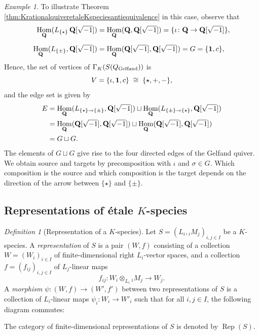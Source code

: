 \documentclass[a4paper,12pt,reqno]{amsart}
\newcommand{\QQ}{{\rm\bf Q}}
\DeclareMathOperator{\Hom}{\mathrm{Hom}}
\DeclareMathOperator{\Rep}{\mathrm{Rep}}
\theoremstyle{plain}
\theoremstyle{remark}
\newtheorem{definition}[theorem]{Definition}
\newtheorem{example}[theorem]{Example}
\begin{document}
\begin{example}
  To illustrate Theorem \ref{thm:KrationalquiveretaleKspeciesantiequivalence} in this case, observe that
  \begin{align*}
  \Hom_\QQ(L_{\{\star\}}\,\QQ[\sqrt{-1}])&=
  \Hom_\QQ(\QQ,\QQ[\sqrt{-1}])=\{\iota\colon\QQ\to\QQ[\sqrt{-1}]\},\\[0.5em]
  \Hom_\QQ(L_{\{\pm\}},\QQ[\sqrt{-1}])&=
  \Hom_\QQ(\QQ[\sqrt{-1}],\QQ[\sqrt{-1}])=G=\{{\bf1},c\},
  \end{align*}
  Hence, the set of vertices of $\Gamma_K(S(Q_{\rm Gelfand}))$ is
  \[
  V=\{\iota,{\bf1},c\}\;\cong\;\{\star,+,-\},
  \]
  and the edge set is given by
  \begin{align*}
  E&=
  \Hom_{\QQ}(L_{\{\star\}\to\{\pm\}},\QQ[\sqrt{-1}])\sqcup
  \Hom_{\QQ}(L_{\{\pm\}\to\{\star\}},\QQ[\sqrt{-1}])\\
  &=
  \Hom_{\QQ}(\QQ[\sqrt{-1}],\QQ[\sqrt{-1}])\sqcup
  \Hom_{\QQ}(\QQ[\sqrt{-1}],\QQ[\sqrt{-1}])\\
  &=G\sqcup G.
  \end{align*}
  The elements of $G\sqcup G$ give rise to the four directed edges of the Gelfand quiver. We obtain source and targets by precomposition with $\iota$ and $\sigma\in G$. Which composition is the source and which composition is the target depends on the direction of the arrow between $\{\star\}$ and $\{\pm\}$.
  \end{example}

  \subsection{Representations of \'etale $K$-species}

  \begin{definition}[Representation of a $K$-species]
  Let $S=(L_i, {}_iM_j)_{i,j\in I}$ be a $K$-species. A \emph{representation} of $S$ is a pair $(W, f)$ consisting of a collection $W = (W_i)_{i \in I}$ of finite-dimensional right $L_i$-vector spaces, and a collection $f = (f_{ij})_{i,j \in I}$ of $L_j$-linear maps
  \[
    f_{ij} \colon W_i \otimes_{L_i} {}_iM_j \to W_j.
  \]
  A \emph{morphism} $\psi \colon (W, f) \to (W', f')$ between two representations of $S$ is a collection of $L_i$-linear maps $\psi_i \colon W_i \to W'_i$ such that for all $i,j \in I$, the following diagram commutes:
  \begin{center}
  \end{center}
  The category of finite-dimensional representations of $S$ is denoted by $\Rep(S)$.
  \end{definition}
\end{document}
